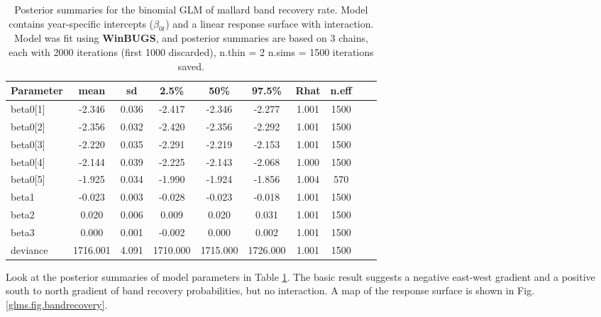 {{{\begin{table}
\caption{Posterior summaries for the binomial GLM of mallard band
  recovery rate.  Model contains year-specific intercepts
  ($\beta_{0t}$) and a linear response surface with interaction. 
Model was fit using {\bf WinBUGS}, and posterior summaries are based 
on 3 chains, each with 2000 iterations (first 1000 discarded), n.thin = 2
 n.sims = 1500 iterations saved.
   }
   \scriptsize
  \begin{tabular}{lccccccccc}
    \hline
        \hline
 Parameter &    mean   & sd   &  2.5\%   &    50\%   &   97.5\% & Rhat & n.eff \\
     \hline
beta0[1] &  -2.346& 0.036&   -2.417&   -2.346&   -2.277& 1.001&  1500\\
beta0[2] &  -2.356& 0.032&   -2.420&   -2.356&   -2.292& 1.001&  1500\\
beta0[3] &  -2.220& 0.035&   -2.291&   -2.219&   -2.153& 1.001&  1500\\
beta0[4] &  -2.144& 0.039&   -2.225&   -2.143&   -2.068& 1.000&  1500\\
beta0[5] &  -1.925& 0.034&   -1.990&   -1.924&   -1.856& 1.004&   570\\
beta1    &  -0.023& 0.003&   -0.028&   -0.023&   -0.018& 1.001&  1500\\
beta2    &   0.020& 0.006&    0.009&    0.020&    0.031& 1.001&  1500\\
beta3    &   0.000& 0.001&   -0.002&    0.000&    0.002& 1.001&  1500\\
deviance &1716.001& 4.091& 1710.000&  1715.000&  1726.000& 1.001&  1500\\
    \hline
  \end{tabular}
  \label{glms.tab.mallard}
\vspace{0.5cm}
\end{table}



Look at the posterior summaries of model parameters in Table \ref{glms.tab.mallard}. The basic result suggests a negative east-west gradient and a positive
south to north gradient of band recovery probabilities, but no interaction. A map of the response
surface is shown in Fig. \ref{glms.fig.bandrecovery}.


}}}
